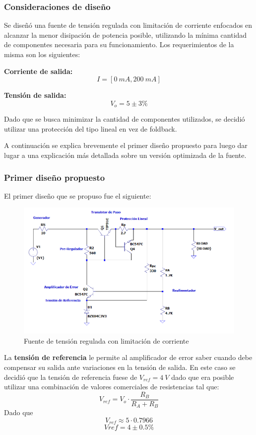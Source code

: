 \subsubsection{Consideraciones de diseño}
Se diseñó una fuente de tensión regulada con limitación de corriente enfocados en alcanzar la menor disipación de potencia posible, utilizando la mínima cantidad de componentes necesaria para su funcionamiento. Los requerimientos de la misma son los siguientes:

\textbf{Corriente de salida:}
\begin{equation}
	I = [0\ mA, 200\ mA]
\end{equation}

\textbf{Tensión de salida:}
\begin{equation}
V_{o} = 5 \pm 3\%
\end{equation}

Dado que se busca minimizar la cantidad de componentes utilizados, se decidió utilizar una protección del tipo lineal en vez de foldback.

A continuación se explica brevemente el primer diseño propuesto para luego dar lugar a una explicación más detallada sobre un versión optimizada de la fuente.

\subsubsection{Primer diseño propuesto}
El primer diseño que se propuso fue el siguiente:
\begin{figure}[H]
	\centering
	\includegraphics[width=0.7\linewidth]{ImagenesEjercicio1/ImagenCircuitoFV}
	\caption{Fuente de tensión regulada con limitación de corriente}
	\label{fig:imagencircuito}
\end{figure}

La \textbf{tensión de referencia} le permite al amplificador de error saber cuando debe compensar su salida ante variaciones en la tensión de salida. 
En este caso se decidió que la tensión de referencia fuese de $V_{ref} = 4\ V$ dado que era posible utilizar una combinación de valores comerciales de resistencias tal que:
\begin{equation}
	V_{ref}  = V_{o} \cdot \frac{R_B}{R_A + R_B}
\end{equation} 
Dado que 
\begin{equation}
	V_{ref} \approx 5 \cdot 0.7966
\end{equation}
\begin{equation}
	V{ref} = 4 \pm 0.5 \%
\end{equation}

